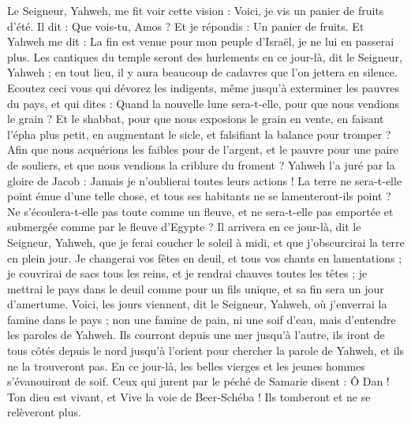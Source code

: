 \begin{multicols}{2}
\VerseOne{}Le Seigneur, Yahweh, me fit voir cette vision : Voici, je vis un panier de fruits d'été.
Il dit : Que vois-tu, Amos ? Et je répondis : Un panier de fruits. Et Yahweh me dit : La fin est venue pour mon peuple d'Israël, je ne lui en passerai plus.
Les cantiques du temple seront des hurlements en ce jour-là, dit le Seigneur, Yahweh ; en tout lieu, il y aura beaucoup de cadavres que l'on jettera en silence.
Ecoutez ceci vous qui dévorez les indigents, même jusqu'à exterminer les pauvres du pays,
et qui dites : Quand la nouvelle lune sera-t-elle, pour que nous vendions le grain ? Et le shabbat, pour que nous exposions le grain en vente, en faisant l'épha plus petit, en augmentant le sicle, et falsifiant la balance pour tromper ?
Afin que nous acquérions les faibles pour de l'argent, et le pauvre pour une paire de souliers, et que nous vendions la criblure du froment ?
Yahweh l'a juré par la gloire de Jacob : Jamais je n'oublierai toutes leurs actions !
La terre ne sera-t-elle point émue d'une telle chose, et tous ses habitants ne se lamenteront-ils point ? Ne s'écoulera-t-elle pas toute comme un fleuve, et ne sera-t-elle pas emportée et submergée comme par le fleuve d'Egypte ? 
Il arrivera en ce jour-là, dit le Seigneur, Yahweh, que je ferai coucher le soleil à midi, et que j'obscurcirai la terre en plein jour.
Je changerai vos fêtes en deuil, et tous vos chants en lamentations ; je couvrirai de sacs tous les reins, et je rendrai chauves toutes les têtes ; je mettrai le pays dans le deuil comme pour un fils unique, et sa fin sera un jour d'amertume.
Voici, les jours viennent, dit le Seigneur, Yahweh, où j'enverrai la famine dans le pays ; non une famine de pain, ni une soif d'eau, mais d'entendre les paroles de Yahweh.
Ils courront depuis une mer jusqu'à l'autre, ils iront de tous côtés depuis le nord jusqu'à l'orient pour chercher la parole de Yahweh, et ils ne la trouveront pas.
En ce jour-là, les belles vierges et les jeunes hommes s'évanouiront de soif.
Ceux qui jurent par le péché de Samarie disent : Ô Dan ! Ton dieu est vivant, et Vive la voie de Beer-Schéba ! Ils tomberont et ne se relèveront plus.

\end{multicols}
